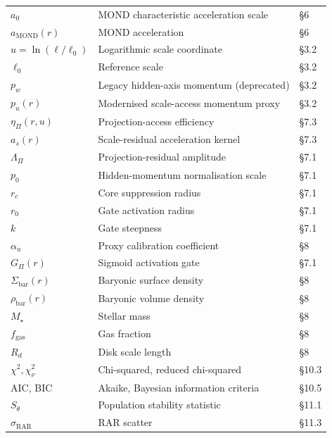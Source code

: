 \documentclass[11pt,a4paper,oneside]{article}
\newcommand{\aMOND}{a_{\mathrm{MOND}}}
\newcommand{\ascale}{a_s}
\newcommand{\LamPi}{\Lambda_{\Pi}}
\newcommand{\pzero}{p_0}
\newcommand{\rc}{r_c}
\newcommand{\rzero}{r_0}
\newcommand{\pu}{p_u}
\newcommand{\pw}{p_w}      %
\newcommand{\usc}{u}                    %
\newcommand{\ellz}{\ell_0}             %
\newcommand{\etaPi}{\eta_{\Pi}}
\newcommand{\GPi}{G_{\Pi}}
\newcommand{\Sbar}{\Sigma_{\mathrm{bar}}}
\newcommand{\rhobar}{\rho_{\mathrm{bar}}}
\newcommand{\Mstar}{M_{\star}}
\newcommand{\fgas}{f_{\mathrm{gas}}}
\newcommand{\Rd}{R_d}
\begin{document}
\begin{longtable}{@{}p{4.0cm}p{6.5cm}p{2.0cm}@{}}
$a_0$           & MOND characteristic acceleration scale              & \S6   \\[2pt]
$\aMOND(r)$     & MOND acceleration                                   & \S6   \\[6pt]
$\usc = \ln(\ell/\ellz)$ & Logarithmic scale coordinate              & \S3.2 \\[2pt]
$\ellz$         & Reference scale                                     & \S3.2 \\[2pt]
$\pw$           & Legacy hidden-axis momentum (deprecated)            & \S3.2 \\[2pt]
$\pu(r)$        & Modernised scale-access momentum proxy              & \S3.2 \\[2pt]
$\etaPi(r,\usc)$ & Projection-access efficiency                       & \S7.3 \\[2pt]
$\ascale(r)$    & Scale-residual acceleration kernel                  & \S7.3 \\[6pt]
$\LamPi$        & Projection-residual amplitude                       & \S7.1 \\[2pt]
$\pzero$        & Hidden-momentum normalisation scale                 & \S7.1 \\[2pt]
$\rc$           & Core suppression radius                             & \S7.1 \\[2pt]
$\rzero$        & Gate activation radius                              & \S7.1 \\[2pt]
$k$             & Gate steepness                                      & \S7.1 \\[2pt]
$\alpha_u$      & Proxy calibration coefficient                       & \S8   \\[2pt]
$\GPi(r)$       & Sigmoid activation gate                             & \S7.1 \\[6pt]
$\Sbar(r)$      & Baryonic surface density                            & \S8   \\[2pt]
$\rhobar(r)$    & Baryonic volume density                             & \S8   \\[2pt]
$\Mstar$        & Stellar mass                                        & \S8   \\[2pt]
$\fgas$         & Gas fraction                                        & \S8   \\[2pt]
$\Rd$           & Disk scale length                                   & \S8   \\[6pt]
$\chi^2,\chi^2_\nu$ & Chi-squared, reduced chi-squared               & \S10.3 \\[2pt]
AIC, BIC        & Akaike, Bayesian information criteria               & \S10.5 \\[2pt]
$S_\theta$      & Population stability statistic                      & \S11.1 \\[2pt]
$\sigma_{\mathrm{RAR}}$ & RAR scatter                                & \S11.3 \\
\end{longtable}
\end{document}

